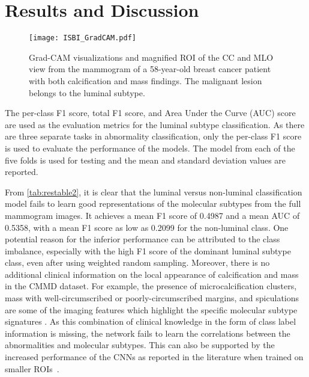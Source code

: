 \documentclass{article}
\begin{document}
\section{Results and Discussion}
\label{sec:results}



\begin{figure*}[htb]

\begin{minipage}[b]{1.0\linewidth}
  \centering
  \centerline{\texttt{[image: ISBI\_GradCAM.pdf]}}
\end{minipage}
\caption{Grad-CAM visualizations and magnified ROI of the CC and MLO view from the mammogram of a 58-year-old breast cancer patient with both calcification and mass findings. The malignant lesion belongs to the luminal subtype.}
\label{fig:grad}
\end{figure*}
The per-class F1 score, total F1 score, and Area Under the Curve (AUC) score are used as the evaluation metrics for the luminal subtype classification. As there are three separate tasks in abnormality classification, only the per-class F1 score is used to evaluate the performance of the models. The model from each of the five folds is used for testing and the mean and standard deviation values are reported. 

From \cref{tab:restable2}, it is clear that the luminal versus non-luminal classification model fails to learn good representations of the molecular subtypes from the full mammogram images. It achieves a mean F1 score of 0.4987 and a mean AUC of 0.5358, with a mean F1 score as low as 0.2099 for the non-luminal class. One potential reason for the inferior performance can be attributed to the class imbalance, especially with the high F1 score of the dominant luminal subtype class, even after using weighted random sampling. Moreover, there is no additional clinical information on the local appearance of calcification and mass in the CMMD dataset. For example, the presence of microcalcification clusters, mass with well-circumscribed or poorly-circumscribed margins, and spiculations are some of the imaging features which highlight the specific molecular subtype signatures \cite{cho2016molecular}. As this combination of clinical knowledge in the form of class label information is missing, the network fails to learn the correlations between the abnormalities and molecular subtypes. This can also be supported by the increased performance of the CNNs as reported in the literature when trained on smaller ROIs~\cite{ueda2021training, zhang2021predicting}.  
\end{document}
